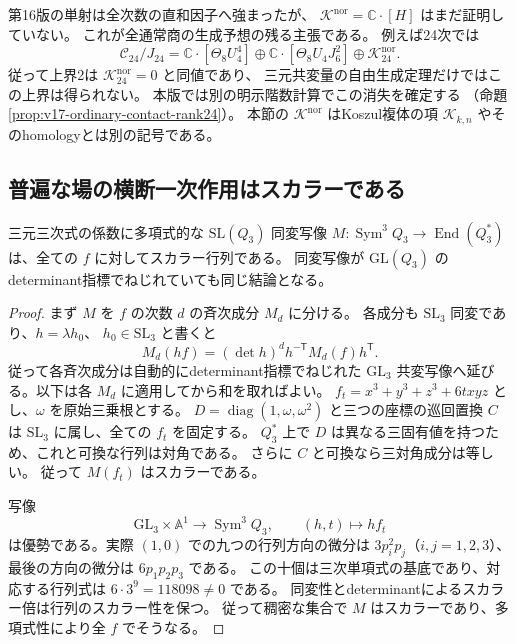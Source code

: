 \begin{remark}[全商の生成問題の正確な残り]
第16版の単射は全次数の直和因子へ強まったが、
$\mathcal K^{\mathrm{nor}}=\mathbb C\cdot[H]$ はまだ証明していない。
これが全通常商の生成予想の残る主張である。
例えば24次では
\[
 \mathcal C_{24}/J_{24}
 =\mathbb C\cdot[\Theta_8U_4^4]\oplus
   \mathbb C\cdot[\Theta_8U_4J_6^2]\oplus\mathcal K_{24}^{\mathrm{nor}}.
\]
従って上界2は $\mathcal K_{24}^{\mathrm{nor}}=0$ と同値であり、
三元共変量の自由生成定理だけではこの上界は得られない。
本版では別の明示階数計算でこの消失を確定する
（命題\ref{prop:v17-ordinary-contact-rank24}）。
本節の $\mathcal K^{\mathrm{nor}}$ はKoszul複体の項
$\mathcal K_{k,n}$ やそのhomologyとは別の記号である。
\end{remark}

\subsection{普遍な場の横断一次作用はスカラーである}

\begin{lemma}[三元三次式からのEnd共変量]
\label{lem:v17-ternary-endomorphism-scalar}
三元三次式の係数に多項式的な
$\mathrm{SL}(Q_3)$ 同変写像
$M:\operatorname{Sym}^3Q_3\to\operatorname{End}(Q_3^*)$
は、全ての $f$ に対してスカラー行列である。
同変写像が $\mathrm{GL}(Q_3)$ のdeterminant指標でねじれていても同じ結論となる。
\end{lemma}

\begin{proof}
まず $M$ を $f$ の次数 $d$ の斉次成分 $M_d$ に分ける。
各成分も $\mathrm{SL}_3$ 同変であり、$h=\lambda h_0$、
$h_0\in\mathrm{SL}_3$ と書くと
\[
 M_d(hf)=(\det h)^d h^{-\mathsf T}M_d(f)h^{\mathsf T}.
\]
従って各斉次成分は自動的にdeterminant指標でねじれた
$\mathrm{GL}_3$ 共変写像へ延びる。以下は各 $M_d$ に適用してから和を取ればよい。
$f_t=x^3+y^3+z^3+6txyz$ とし、$\omega$ を原始三乗根とする。
$D=\operatorname{diag}(1,\omega,\omega^2)$ と三つの座標の巡回置換 $C$
は $\mathrm{SL}_3$ に属し、全ての $f_t$ を固定する。
$Q_3^*$ 上で $D$ は異なる三固有値を持つため、これと可換な行列は対角である。
さらに $C$ と可換なら三対角成分は等しい。
従って $M(f_t)$ はスカラーである。

写像
\[
 \mathrm{GL}_3\times\mathbb A^1\longrightarrow\operatorname{Sym}^3Q_3,
 \qquad(h,t)\longmapsto hf_t
\]
は優勢である。実際 $(1,0)$ での九つの行列方向の微分は
$3p_i^2p_j$（$i,j=1,2,3$）、最後の方向の微分は $6p_1p_2p_3$ である。
この十個は三次単項式の基底であり、対応する行列式は
$6\cdot3^9=118098\ne0$ である。
同変性とdeterminantによるスカラー倍は行列のスカラー性を保つ。
従って稠密な集合で $M$ はスカラーであり、多項式性により全 $f$ でそうなる。
\end{proof}


